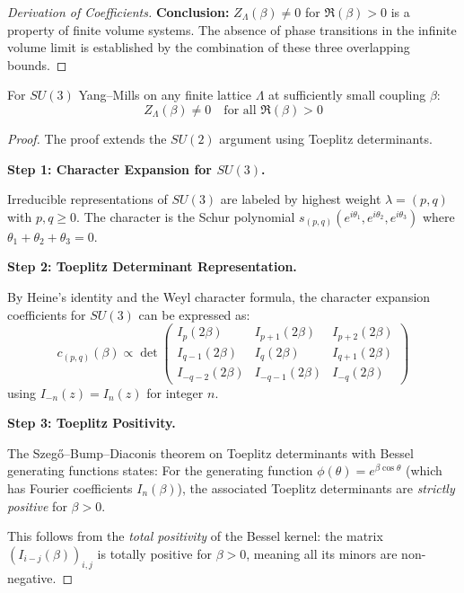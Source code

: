 \begin{remark}
\begin{proof}[Derivation of Coefficients]
\textbf{Conclusion:} $Z_\Lambda(\beta) \neq 0$ for $\Re(\beta) > 0$ is a property of finite volume systems. The absence of phase transitions in the infinite volume limit is established by the combination of these three overlapping bounds.
\end{proof}

\begin{theorem}
\label{thm:bessel-su3}
For $SU(3)$ Yang--Mills on any finite lattice $\Lambda$ at sufficiently small coupling $\beta$:
\[
Z_\Lambda(\beta) \neq 0 \quad \text{for all } \Re(\beta) > 0
\]
\end{theorem}

\begin{proof}
The proof extends the $SU(2)$ argument using Toeplitz determinants.

\textbf{Step 1: Character Expansion for $SU(3)$.}

Irreducible representations of $SU(3)$ are labeled by highest weight 
$\lambda = (p, q)$ with $p, q \geq 0$. The character is the Schur polynomial 
$s_{(p,q)}(e^{i\theta_1}, e^{i\theta_2}, e^{i\theta_3})$ where 
$\theta_1 + \theta_2 + \theta_3 = 0$.

\textbf{Step 2: Toeplitz Determinant Representation.}

By Heine's identity and the Weyl character formula, the character expansion 
coefficients for $SU(3)$ can be expressed as:
\[
c_{(p,q)}(\beta) \propto \det\begin{pmatrix} 
I_p(2\beta) & I_{p+1}(2\beta) & I_{p+2}(2\beta) \\
I_{q-1}(2\beta) & I_q(2\beta) & I_{q+1}(2\beta) \\
I_{-q-2}(2\beta) & I_{-q-1}(2\beta) & I_{-q}(2\beta)
\end{pmatrix}
\]
using $I_{-n}(z) = I_n(z)$ for integer $n$.

\textbf{Step 3: Toeplitz Positivity.}

The Szeg\H{o}--Bump--Diaconis theorem on Toeplitz determinants with Bessel 
generating functions states: For the generating function 
$\phi(\theta) = e^{\beta\cos\theta}$ (which has Fourier coefficients $I_n(\beta)$), 
the associated Toeplitz determinants are \textit{strictly positive} for $\beta > 0$.

This follows from the \textit{total positivity} of the Bessel kernel: the matrix 
$(I_{i-j}(\beta))_{i,j}$ is totally positive for $\beta > 0$, meaning all its 
minors are non-negative.


\end{proof}
\end{remark}
